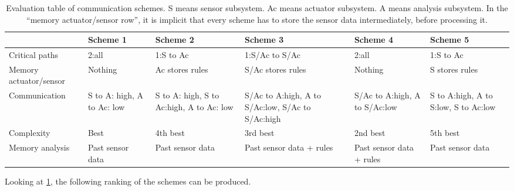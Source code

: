 \begin{table}[htbp]
\centering
\begin{adjustbox}{angle=90}
\begin{tabular}{m{7em} m{7em} m{7em} m{7em} m{8em} m{8em}}
\toprule
                       & Scheme 1                                          & Scheme 2                                 & Scheme 3                                         & Scheme 4                      & Scheme 5                             \\ \midrule
Critical paths         & 2:all                                             & 1:S to Ac                                & 1:S/Ac to S/Ac                                   & 2:all                         & 1:S to Ac                            \\ \midrule
Memory actuator/sensor & Nothing                                           & Ac stores rules                          & S/Ac stores rules                                & Nothing                       & S stores rules                       \\ \midrule
Communication          & S to A: high, A to Ac: low                        & S to A: high, S to Ac:high, A to Ac: low & S/Ac to A:high, A to S/Ac:low, S/Ac to S/Ac:high & S/Ac to A:high, A to S/Ac:low & S to A:high, A to S:low, S to Ac:low \\ \midrule
Complexity             & Best                                              & 4th best                                 & 3rd best                                         & 2nd best                      & 5th best                             \\ \midrule
Memory analysis        & Past sensor data                                  & Past sensor data                         & Past sensor data + rules                         & Past sensor data + rules      & Past sensor data                     \\ \bottomrule
\end{tabular}
\end{adjustbox}
\caption{Evaluation table of communication schemes. S means sensor subsystem. Ac means actuator subsystem. A means analysis subsystem. In the \enquote{memory actuator/sensor row}, it is implicit that every scheme has to store the sensor data intermediately, before processing it.}\label{tab:scheme_choice}
\end{table}

Looking at \cref{tab:scheme_choice}, the following ranking of the schemes can be produced. 
